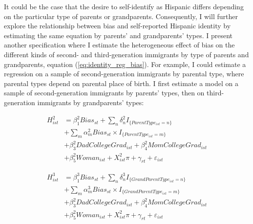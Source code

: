 \documentclass[12pt, fullpage]{article}
\begin{document}
It could be the case that the desire to self-identify as Hispanic differs depending on the particular type of parents or grandparents. Consequently, I will further explore the relationship between bias and self-reported Hispanic identity by estimating the same equation by parents' and grandparents' types. I present another specification where I estimate the heterogeneous effect of bias on the different kinds of second- and third-generation immigrants by type of parents and grandparents, equation (\ref{eq:identity_reg_bias}). For example, I could estimate a regression on a sample of second-generation immigrants by parental type, where parental types depend on parental place of birth. I first estimate a model on a sample of second-generation immigrants by parents' types, then on third-generation immigrants by grandparents' types: 

\begin{align}
H_{ist}^2 &= \beta_1^2 Bias_{st} + \sum_{n}\delta_n^2 I_{\{ParentType_{ist} = n\}}  \label{eq:identity_reg_bias_interaction_2} \\
&+\sum_{m} \alpha_m^2 Bias_{st} \times I_{\{ParentType_{ist} = m\}} \nonumber \\
&+ \beta_3^2 DadCollegeGrad_{ist} + \beta_4^2 MomCollegeGrad_{ist} \nonumber \\ 
&+ \beta_5^2 Woman_{ist} + X_{ist}^2\pi + \gamma_{rt} + \varepsilon_{ist} \nonumber
\end{align}

\begin{align}
H_{ist}^3 &= \beta_1^3 Bias_{st} + \sum_{n}\delta_n^3 I_{\{GrandParentType_{ist} = n\}}  \label{eq:identity_reg_bias_interaction_3} \\
&+\sum_{m} \alpha_m^3  Bias_{st} \times I_{\{GrandParentType_{ist} = m\}} \nonumber \\
&+ \beta_3^2 DadCollegeGrad_{ist} + \beta_4^2 MomCollegeGrad_{ist} \nonumber \\ 
&+ \beta_5^2 Woman_{ist} + X_{ist}^2\pi + \gamma_{rt} + \varepsilon_{ist} \nonumber
\end{align}
\end{document}
